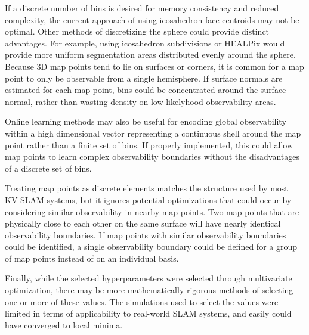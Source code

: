 If a discrete number of bins is desired for memory consistency and reduced complexity, the current approach of using icosahedron face centroids may not be optimal. Other methods of discretizing the sphere could provide distinct advantages. For example, using icosahedron subdivisions or HEALPix would provide more uniform segmentation areas distributed evenly around the sphere. Because 3D map points tend to lie on surfaces or corners, it is common for a map point to only be observable from a single hemisphere. If surface normals are estimated for each map point, bins could be concentrated around the surface normal, rather than wasting density on low likelyhood observability areas.

Online learning methods may also be useful for encoding global observability within a high dimensional vector representing a continuous shell around the map point rather than a finite set of bins. If properly implemented, this could allow map points to learn complex observability boundaries without the disadvantages of a discrete set of bins.

Treating map points as discrete elements matches the structure used by most KV-SLAM systems, but it ignores potential optimizations that could occur by considering similar observability in nearby map points. Two map points that are physically close to each other on the same surface will have nearly identical observability boundaries. If map points with similar observability boundaries could be identified, a single observability boundary could be defined for a group of map points instead of on an individual basis.

Finally, while the selected hyperparameters were selected through multivariate optimization, there may be more mathematically rigorous methods of selecting one or more of these values. The simulations used to select the values were limited in terms of applicability to real-world SLAM systems, and easily could have converged to local minima. 